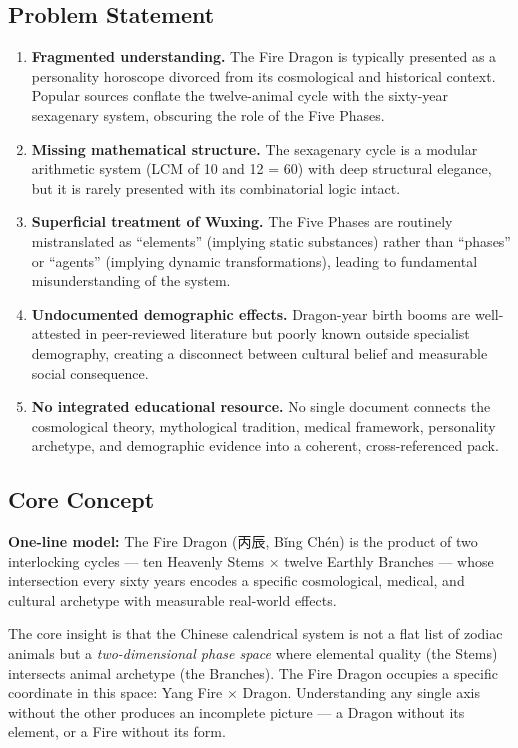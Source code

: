\documentclass[11pt,letterpaper]{article}
\begin{document}
\subsection{Problem Statement}

\begin{enumerate}[leftmargin=2em]
\item \textbf{Fragmented understanding.} The Fire Dragon is typically presented as a personality horoscope divorced from its cosmological and historical context. Popular sources conflate the twelve-animal cycle with the sixty-year sexagenary system, obscuring the role of the Five Phases.
\item \textbf{Missing mathematical structure.} The sexagenary cycle is a modular arithmetic system (LCM of 10 and 12 = 60) with deep structural elegance, but it is rarely presented with its combinatorial logic intact.
\item \textbf{Superficial treatment of Wuxing.} The Five Phases are routinely mistranslated as ``elements'' (implying static substances) rather than ``phases'' or ``agents'' (implying dynamic transformations), leading to fundamental misunderstanding of the system.
\item \textbf{Undocumented demographic effects.} Dragon-year birth booms are well-attested in peer-reviewed literature but poorly known outside specialist demography, creating a disconnect between cultural belief and measurable social consequence.
\item \textbf{No integrated educational resource.} No single document connects the cosmological theory, mythological tradition, medical framework, personality archetype, and demographic evidence into a coherent, cross-referenced pack.
\end{enumerate}

\subsection{Core Concept}

\begin{quotebox}
\textbf{One-line model:} The Fire Dragon (丙辰, Bǐng Chén) is the product of two interlocking cycles --- ten Heavenly Stems $\times$ twelve Earthly Branches --- whose intersection every sixty years encodes a specific cosmological, medical, and cultural archetype with measurable real-world effects.
\end{quotebox}

The core insight is that the Chinese calendrical system is not a flat list of zodiac animals but a \emph{two-dimensional phase space} where elemental quality (the Stems) intersects animal archetype (the Branches). The Fire Dragon occupies a specific coordinate in this space: Yang Fire $\times$ Dragon. Understanding any single axis without the other produces an incomplete picture --- a Dragon without its element, or a Fire without its form.
\end{document}
